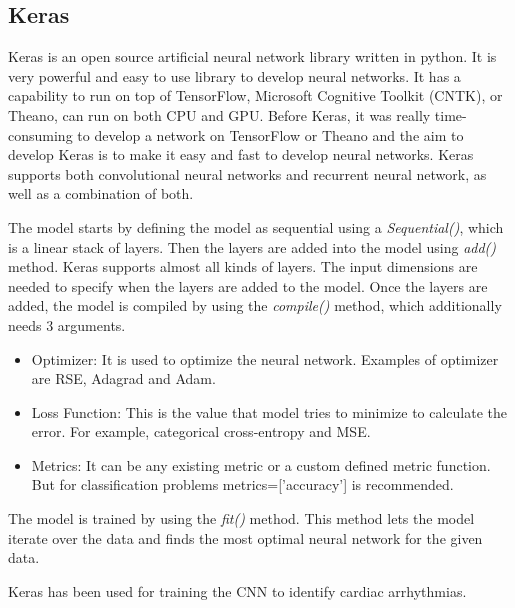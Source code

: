 \subsection{Keras}

Keras is an open source artificial neural network library written in python. It is very powerful and easy to use library to develop neural networks. It has a capability to run on top of TensorFlow, Microsoft Cognitive Toolkit (CNTK), or Theano, can run on both CPU and GPU. Before Keras, it was really time-consuming to develop a network on TensorFlow or Theano and the aim to develop Keras is to make it easy and fast to develop neural networks. Keras supports both convolutional neural networks and recurrent neural network, as well as a combination of both.

The model starts by defining the model as sequential using a \textit{Sequential()}, which is a linear stack of layers. Then the layers are added into the model using \textit{add()} method. Keras supports almost all kinds of layers. The input dimensions are needed to specify when the layers are added to the model. Once the layers are added, the model is compiled by using the \textit{compile()} method, which additionally needs 3 arguments.

\begin{itemize}
	\item Optimizer: It is used to optimize the neural network. Examples of optimizer are RSE, Adagrad and Adam.
	\item Loss Function: This is the value that model tries to minimize to calculate the error. For example, categorical cross-entropy and MSE.
	\item Metrics: It can be any existing metric or a custom defined metric function. But for classification problems metrics=['accuracy'] is recommended.
\end{itemize}

The model is trained by using the \textit{fit()} method. This method lets the model iterate over the data and finds the most optimal neural network for the given data.

Keras has been used for training the CNN to identify cardiac arrhythmias.


